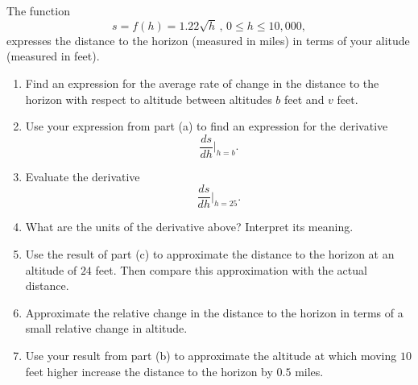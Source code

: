 \documentclass{ximera}
\begin{document}
\begin{question} \label{Qdggbrgthghghb}
The function
\[
      s = f(h) = 1.22\sqrt{h} \, , \, 0\leq h \leq 10,000 ,
\]
expresses the distance to the horizon (measured in miles) in terms of your alitude (measured in feet).

\begin{enumerate}
\item Find an expression for the average rate of change in the distance to the horizon with respect to altitude between altitudes $b$ feet and $v$ feet.

\item Use your expression from part (a) to find an expression for the derivative 
\[
    \frac{ds}{dh}\Big|_{h=b}.
\]

\item Evaluate the derivative 
\[
       \frac{ds}{dh}\Big|_{h=25} .
\]

\item What are the units of the derivative above? Interpret its meaning.

\item Use the result of part (c) to approximate the distance to the horizon at an altitude of $24$ feet. Then compare this approximation with the actual distance.

\item Approximate the relative change in the distance to the horizon in terms of a small relative change in altitude.

\item Use your result from part (b) to approximate the altitude at which moving $10$ feet higher increase the distance to the horizon by $0.5$ miles.

\end{enumerate}
\end{question}
\end{document}
